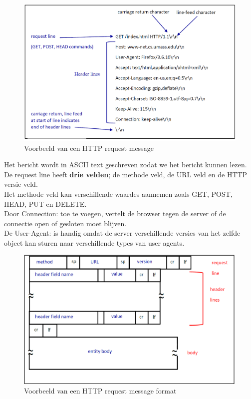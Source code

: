 \begin{figure}[h]
    \centering
    \includegraphics[width=7in]{./img/imghfdst2/httprequestmessage.PNG}
    \caption{Voorbeeld van een HTTP request message}
    \label{fig:http request message}
\end{figure}

\noindent Het bericht wordt in ASCII text geschreven zodat we het bericht kunnen lezen.\\

\noindent De request line heeft \textbf{drie velden}; de methode veld, de URL veld en de HTTP versie veld.\\

\noindent Het methode veld kan verschillende waardes aannemen zoals GET, POST, HEAD, PUT en DELETE.\\

\noindent Door Connection: toe te voegen, vertelt de browser tegen de server of de connectie open of gesloten moet blijven. \\

\noindent De User-Agent: is handig omdat de server verschillende versies van het zelfde object kan sturen naar verschillende types van user agents.

\clearpage


\begin{figure}[h]
    \centering
    \includegraphics[width=7in]{./img/imghfdst2/httprequestgeneral.PNG}
    \caption{Voorbeeld van een HTTP request message format}
    \label{fig:http request message format}
\end{figure}

